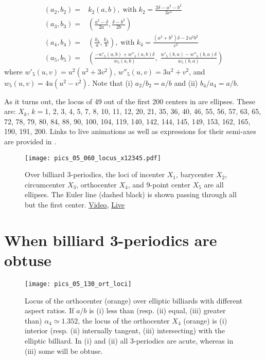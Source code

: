\begin{align*}
    \left(a_2,b_2\right)=&k_2\left(a,b\right),\;\text{with}\; k_2=\frac{2\delta -a^{2}-b^{2}}{3c^2}\\
     \left(a_3,b_3\right)=&\left(\frac{a^{2}-\delta}{2a},\frac{\delta-b^{2}}{2b}\right)\\
 \left(a_4,b_4\right)=&\left(\frac{k_4}a,\frac{k_4}b\right),\;\text{with}\;k_4=\frac{  (a^{2}+b^{2})\delta-2\,a^{2}b^{2} }{c^2}\\
   \left(a_5,b_5\right)=&\left(\frac{- w'_5(a,b)+ w''_5(a,b) \delta}{ w_5(a,b)},\;\frac{ w'_5(b,a)-{w''_5(b,a) \delta}}{w_5(b,a)}\right)
\end{align*}
where $w'_5(u,v)=u^2(u^2+3v^2)$, $w''_5(u,v)=3u^2+ v^2$, and $w_5(u,v)=4u(u^2-v^2)$. Note that (i) $a_2/b_2=a/b$ and (ii) $b_4/a_4=a/b$.

As it turns out, the locus of 49 out of the first 200 centers in \cite{etc} are ellipses. These are: $X_k$, $k=$1,  2,  3,  4,  5,  7,  8,  10,  11,  12,  20,  21,  35,  36,  40,  46,  55,  56,  57,  63,  65,  72,  78,  79,  80,  84,  88,  90,  100,  104,  119,  140,  142,  144,  145,  149,  153,  162,  165,  190,  191,  200. Links to live animations as well as expressions for their semi-axes are provided in \cite{garcia2021-ellipses-web}.


\begin{figure}
\centering
\texttt{[image: pics\_05\_060\_locus\_x12345.pdf]}
\caption{Over billiard 3-periodics, the loci of incenter $X_1$, barycenter $X_2$, circumcenter $X_3$, orthocenter $X_4$, and 9-point center $X_5$ are all ellipses. The Euler line (dashed black) is shown passing through all but the first center. \href{https://youtu.be/sMcNzcYaqtg}{Video}, \href{https://bit.ly/3eVScgE}{Live}}
\label{fig:05-x12345}
\end{figure}

\section{When billiard 3-periodics are obtuse}

\begin{figure}
    \centering
    \texttt{[image: pics\_05\_130\_ort\_loci]}
    \caption{Locus of the orthocenter (orange) over elliptic billiards with different aspect ratios. If $a/b$ is (i) less than (resp. (ii) equal, (iii) greater than) $\alpha_4{\simeq}1.352$, the locus of the orthocenter $X_4$ (orange) is (i) interior (resp. (ii) internally tangent, (iii) intersecting) with the elliptic billiard. In (i) and (ii) all 3-periodics are acute, whereas in (iii) some will be obtuse.}
    \label{fig:05-orthocenter-loci}
\end{figure}

